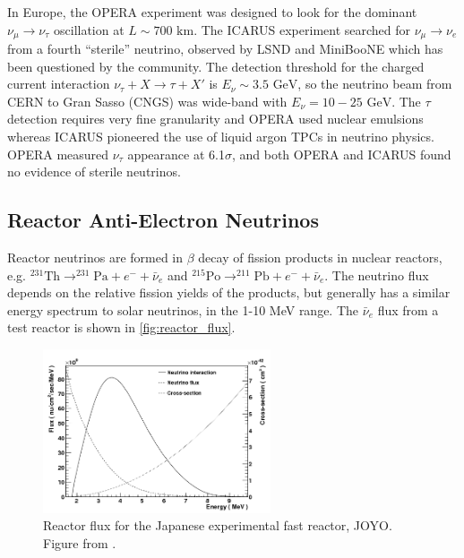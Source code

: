In Europe, the OPERA\cite{opera} experiment was designed to look for the dominant $\nu_\mu \rightarrow \nu_\tau$ oscillation at $L\sim700\text{ km}$. The ICARUS\cite{icarus} experiment searched for $\nu_\mu\rightarrow\nu_e$ from a fourth ``sterile'' neutrino, observed by LSND\cite{lsnd} and MiniBooNE\cite{miniboone_sterile} which has been questioned by the community\cite{lsnd_refute}. The detection threshold for the charged current interaction $\nu_\tau + X \rightarrow \tau + X'$ is $E_\nu\sim 3.5\text{ GeV}$, so the neutrino beam from CERN to Gran Sasso (CNGS)\cite{cngs} was wide-band with $E_\nu = 10-25\text{ GeV}$. The $\tau$ detection requires very fine granularity and OPERA used nuclear emulsions whereas ICARUS pioneered the use of liquid argon TPCs in neutrino physics. OPERA measured $\nu_\tau$ appearance\cite{opera_final_tau} at 6.1$\sigma$, and both OPERA and ICARUS found no evidence of sterile neutrinos\cite{icarus_lsnd,opera_lsnd}.

\subsection{Reactor Anti-Electron Neutrinos}
Reactor neutrinos are formed in $\beta$ decay of fission products in nuclear reactors, e.g. $^{231}\text{Th} \rightarrow ^{231}\text{Pa} + e^- + \bar{\nu}_e$ and $^{215}\text{Po} \rightarrow ^{211}\text{Pb} + e^- + \bar{\nu}_e$. The neutrino flux depends on the relative fission yields of the products, but generally has a similar energy spectrum to solar neutrinos, in the 1-10 MeV range. The $\bar{\nu}_e$ flux from a test reactor is shown in \autoref{fig:reactor_flux}.
\begin{figure}[h]
	\includegraphics[width=0.6\textwidth, trim={0mm 0mm 0mm 0mm}, clip,page=1]{figures/theory/reactor_flux}
	\caption{Reactor flux for the Japanese experimental fast reactor, JOYO. Figure from \cite{reactor_flux}.}
	\label{fig:reactor_flux}
\end{figure}

